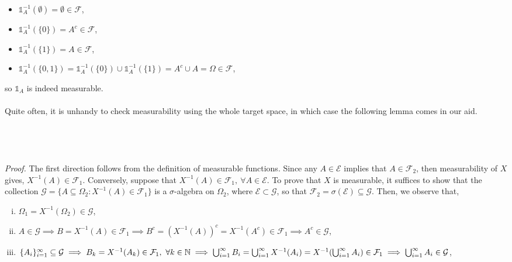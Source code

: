 \documentclass{article}
\begin{document}
\begin{itemize}
	\item $\mathds{1}_{A}^{-1}(\emptyset) = \emptyset \in \mathcal{F}$,
	\item $\mathds{1}_{A}^{-1}(\{0\}) = A^c \in \mathcal{F}$,
	\item $\mathds{1}_{A}^{-1}(\{1\}) = A \in \mathcal{F}$,
	\item $\mathds{1}_{A}^{-1}(\{0,1\}) = \mathds{1}_A^{-1}(\{0\}) \cup \mathds{1}_A^{-1}(\{1\}) = A^c \cup A = \Omega \in \mathcal{F}$,
\end{itemize}
so $\mathds{1}_A$ is indeed measurable.\\\\
Quite often, it is unhandy to check measurability using the whole target space, in which case the following lemma comes in our aid.\\\\
\noindent{}\\\\\\
\textit{Proof.} The first direction follows from the definition of measurable functions. Since any $A \in \mathcal{E}$ implies that $A \in \mathcal{F}_2$, then measurability of $X$ gives, $X^{-1}(A) \in \mathcal{F}_1$. Conversely, suppose that $X^{-1}(A) \in \mathcal{F}_1, \ \forall A \in \mathcal{E}$. To prove that $X$ is measurable, it suffices to show that the collection $\mathcal{G} = \{A \subseteq \Omega_2: X^{-1}(A) \in \mathcal{F}_1\}$ is a $\sigma$-algebra on $\Omega_2$, where $\mathcal{E} \subset \mathcal{G}$, so that $\mathcal{F}_2 = \sigma(\mathcal{E}) \subseteq \mathcal{G}$. Then, we observe that,
\begin{enumerate}[(i)]
	\item  $\Omega _1 = X^{-1}(\Omega_2) \in \mathcal{G}$,
	\item $A \in \mathcal{G} \implies B = X^{-1}(A) \in \mathcal{F}_1 \implies B^c = (X^{-1}(A))^c = X^{-1}(A^c) \in \mathcal{F}_1 \implies A^c \in \mathcal{G}$,
	\item $\{A_i\}_{i=1}^{\infty} \subseteq \mathcal{G} \implies B_k = X^{-1}(A_k) \in \mathcal{F}_1, \ \forall k \in \mathbb{N} \\ \implies \bigcup_{i=1}^{\infty}B_i = \bigcup_{i=1}^{\infty}X^{-1}(A_i) = X^{-1}(\bigcup_{i=1}^{\infty}A_i) \in \mathcal{F}_1 \implies \bigcup_{i=1}^{\infty}A_i \in \mathcal{G}$,
\end{enumerate}
\end{document}
